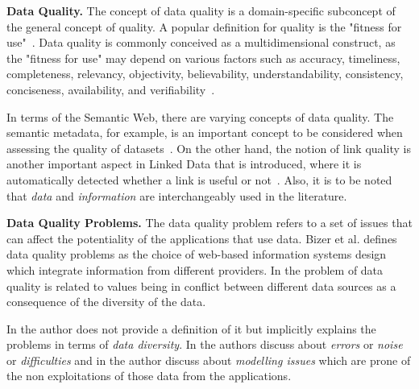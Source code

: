 \textbf{Data Quality.}
The concept of data quality is a domain-specific subconcept of the general concept of quality. 
A popular definition for quality is the "fitness for use"~\cite{qdefn}.
Data quality is commonly conceived as a multidimensional construct, as the "fitness for use" may depend on various factors such as accuracy, timeliness, completeness, relevancy, objectivity, believability, understandability, consistency, conciseness, availability, and verifiability~\cite{qconsumers}.

In terms of the Semantic Web, there are varying concepts of data quality.
The semantic metadata, for example, is an important concept to be considered when assessing the quality of datasets~\cite{Leigold}.
On the other hand, the notion of link quality is another important aspect in Linked Data that is introduced, where it is automatically detected whether a link is useful or not~\cite{Gueret}.
Also, it is to be noted that \textit{data} and \textit{information} are interchangeably used in the literature. 

\textbf{Data Quality Problems.}
The data quality problem refers to a set of issues that can affect the potentiality of the applications that use data. 
Bizer et al. \cite{Bizer} defines data quality problems as the choice of web-based information systems design which integrate information from different providers.  In \cite{Mendes} the problem of data quality is related to values being in conflict between different data sources as a consequence of the diversity of the data. 

In \cite{Flemming} the author does not provide a definition of it but implicitly explains the problems in terms of \textit{data diversity}. 
In \cite{Hogan} the authors discuss about \textit{errors} or \textit{noise} or \textit{difficulties} and in \cite{Hogan:2012} the author discuss about \textit{modelling issues} which are prone of the non exploitations of those data from the applications.
%
%
%

